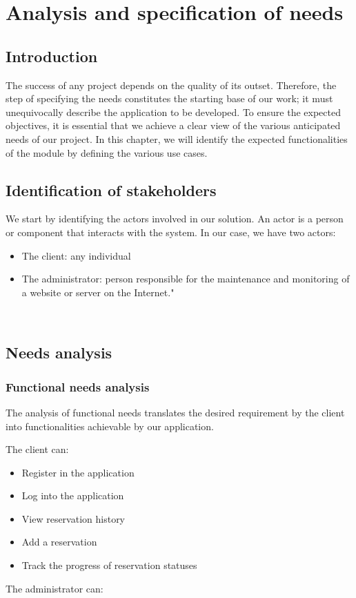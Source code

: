\chapter{Analysis and specification of needs }

\section{Introduction}

The success of any project depends on the quality of its outset. Therefore, the step of specifying the needs constitutes the starting base of our work; it must unequivocally describe the application to be developed. To ensure the expected objectives, it is essential that we achieve a clear view of the various anticipated needs of our project. In this chapter, we will identify the expected functionalities of the module by defining the various use cases. 

\section{Identification of stakeholders}

We start by identifying the actors involved in our solution. An actor is a person or component that interacts with the system. In our case, we have two actors:

\begin{itemize}
    \item The client: any individual
    \item The administrator: person responsible for the maintenance and 
        monitoring of a website or server on the Internet."
\end{itemize}
 \\
 
\section{Needs analysis }

\subsection{Functional needs analysis }

The analysis of functional needs translates the desired requirement by the client into functionalities achievable by our application.

The client can:

\begin{itemize}
    \item Register in the application
    \item Log into the application
    \item View reservation history
    \item Add a reservation
    \item Track the progress of reservation statuses
\end{itemize}
        The administrator can:


